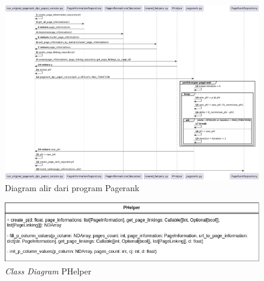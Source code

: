 \begin{figure}[H]
\centering
\includegraphics[width={\textheight}, height={\textwidth}, angle=270]{gambar/run_original_pagerank_dpc_paper_version_sequence_diagram}
\caption{Diagram alir dari program Pagerank}
\label{gambar:run_original_pagerank_dpc_paper_version_sequence_diagram}
\end{figure}

\begin{figure}[H]
\centering
\includegraphics[keepaspectratio, width={\textwidth}]{gambar/p_helper_class_diagram(2)}
\caption{\textit{Class Diagram} PHelper}
\label{gambar:p_helper_class_diagram_2}
\end{figure}

